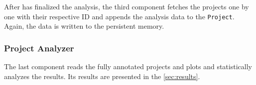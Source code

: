 After \teamscale{} has finalized the analysis, the third component fetches the projects one by one with their respective ID and appends the analysis data to the \texttt{Project}. Again, the data is written to the persistent memory.

\subsubsection{Project Analyzer}

The last component reads the fully annotated projects and plots and statistically analyzes the results. Its results are presented in the \autoref{sec:results}.